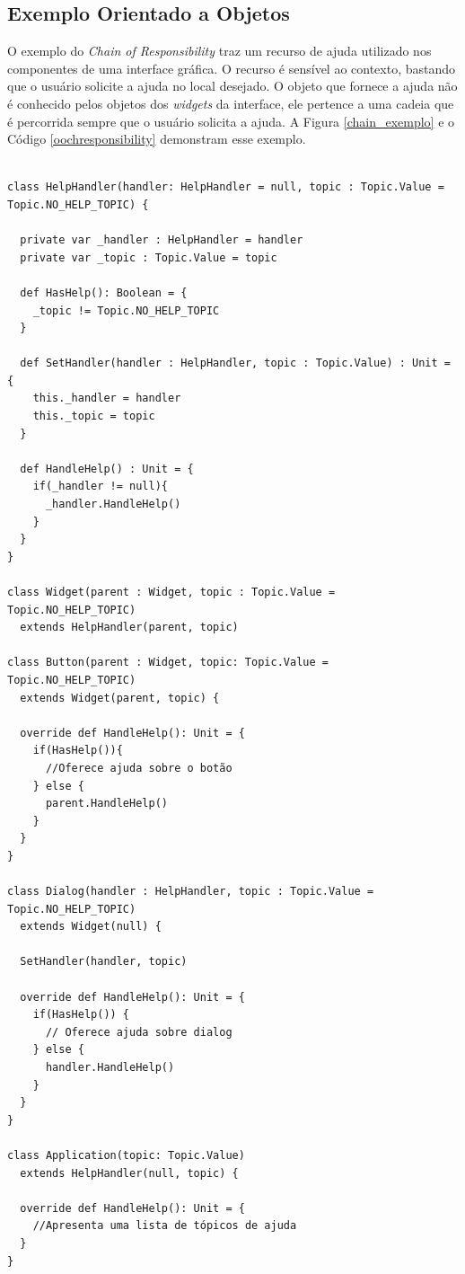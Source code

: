 \subsection*{Exemplo Orientado a Objetos}

O exemplo do \textit{Chain of Responsibility} traz um recurso 
de ajuda utilizado nos componentes de uma 
interface gráfica. O recurso é sensível ao contexto, 
bastando que o usuário solicite a ajuda no local 
desejado. O objeto que fornece a ajuda não é 
conhecido pelos objetos dos \textit{widgets} da 
interface, ele pertence a uma cadeia que é 
percorrida sempre que o usuário solicita 
a ajuda. A Figura \ref{chain_exemplo} e o Código 
\ref{oochresponsibility} demonstram esse exemplo.

\begin{lstlisting}[caption={\textit{Chain of Responsibility} Orientação a Objetos.},label=oochresponsibility]

class HelpHandler(handler: HelpHandler = null, topic : Topic.Value = Topic.NO_HELP_TOPIC) {

  private var _handler : HelpHandler = handler
  private var _topic : Topic.Value = topic

  def HasHelp(): Boolean = {
    _topic != Topic.NO_HELP_TOPIC
  }

  def SetHandler(handler : HelpHandler, topic : Topic.Value) : Unit = {
    this._handler = handler
    this._topic = topic
  }

  def HandleHelp() : Unit = {
    if(_handler != null){
      _handler.HandleHelp()
    }
  }
}

class Widget(parent : Widget, topic : Topic.Value = Topic.NO_HELP_TOPIC)
  extends HelpHandler(parent, topic)
  
class Button(parent : Widget, topic: Topic.Value = Topic.NO_HELP_TOPIC)
  extends Widget(parent, topic) {

  override def HandleHelp(): Unit = {
    if(HasHelp()){
      //Oferece ajuda sobre o botão
    } else {
      parent.HandleHelp()
    }
  }
}

class Dialog(handler : HelpHandler, topic : Topic.Value = Topic.NO_HELP_TOPIC)
  extends Widget(null) {

  SetHandler(handler, topic)

  override def HandleHelp(): Unit = {
    if(HasHelp()) {
      // Oferece ajuda sobre dialog
    } else {
      handler.HandleHelp()
    }
  }
}

class Application(topic: Topic.Value)
  extends HelpHandler(null, topic) {

  override def HandleHelp(): Unit = {
    //Apresenta uma lista de tópicos de ajuda
  }
}

\end{lstlisting}

